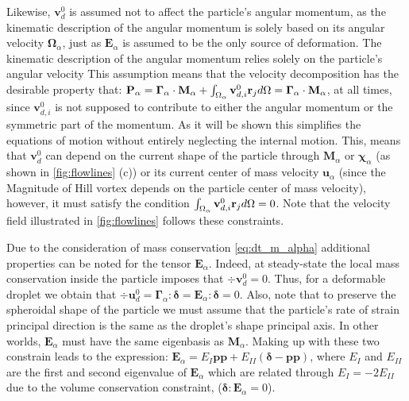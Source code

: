 Likewise, $\textbf{v}_d^0$ is assumed not to affect the particle's angular momentum, as the kinematic description of the angular momentum is solely based on its angular velocity $\bm\Omega_\alpha$, just as $\textbf{E}_\alpha$ is assumed to be the only source of deformation. 
The kinematic description of the angular momentum relies solely on the particle's angular velocity
This assumption means that the velocity decomposition has the desirable property that: $\textbf{P}_\alpha = \bm\Gamma_\alpha \cdot \textbf{M}_\alpha + \int_{\Omega_{\alpha}} \textbf{v}^0_{d,i} \textbf{r}_j d\Omega =  \bm\Gamma_\alpha \cdot \textbf{M}_\alpha $, at all times, since $\textbf{v}^0_{d,i} $ is not supposed to contribute to either the angular momentum or the symmetric part of the momentum. 
As it will be shown this simplifies the equations of motion without entirely neglecting the internal motion.
This, means that $\textbf{v}^0_{d}$ can depend on the current shape of the particle through $\textbf{M}_\alpha$ or $\bm\chi_\alpha$ (as shown in \ref{fig:flowlines} (c)) or its current center of mass velocity $\textbf{u}_\alpha$ (since the Magnitude of Hill vortex depends on the particle center of mass velocity), however, it must satisfy the condition $\int_{\Omega_{\alpha}} \textbf{v}^0_{d,i} \textbf{r}_j d\Omega  = 0$.
Note that the velocity field illustrated in \ref{fig:flowlines} follows these constraints. 

Due to the consideration of mass conservation \eqref{eq:dt_m_alpha} additional properties can be noted for the tensor $\textbf{E}_\alpha$.
Indeed, at steady-state the local mass conservation inside the particle imposes that $\div \textbf{v}_d^0 = 0$. 
Thus, for a deformable droplet we obtain that $\div \textbf{u}_d^0 = \bm\Gamma_\alpha : \bm\delta = \textbf{E}_\alpha : \bm\delta =  0$.  
Also, note that to preserve the spheroidal shape of the particle we must assume that the particle's rate of strain principal direction is the same as the droplet's shape principal axis. 
In other worlds, $\textbf{E}_\alpha$ must have the same eigenbasis as $\textbf{M}_\alpha$. 
Making up with these two constrain leads to the expression: $\textbf{E}_\alpha = E_I \textbf{pp} + E_{II} (\bm\delta - \textbf{pp})$, where $E_I$ and $E_{II}$ are the first and second eigenvalue of $\textbf{E}_\alpha$ which are related through $E_I = - 2E_{II}$ due to the volume conservation constraint, ($\bm\delta : \textbf{E}_\alpha =0$). 


